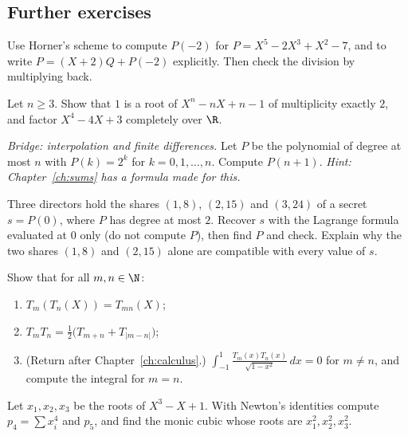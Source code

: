 \subsection*{Further exercises}

\begin{exercise}[$\star$]\label{ex:horner}
Use Horner's scheme to compute $P(-2)$ for $P=X^5-2X^3+X^2-7$, and to write $P=(X+2)Q+P(-2)$ explicitly. Then check the division by multiplying back.
\end{exercise}

\begin{exercise}[$\star$]\label{ex:multroot}
Let $n\ge3$. Show that $1$ is a root of $X^n-nX+n-1$ of multiplicity exactly $2$, and factor $X^4-4X+3$ completely over $\R$.
\end{exercise}

\begin{exercise}[$\star\star$]\label{ex:lagrange2k}
\emph{Bridge: interpolation and finite differences.} Let $P$ be the polynomial of degree at most $n$ with $P(k)=2^k$ for $k=0,1,\dots,n$. Compute $P(n+1)$. \emph{Hint: Chapter~\ref{ch:sums} has a formula made for this.}
\end{exercise}

\begin{exercise}[$\star\star$]\label{ex:secret}
Three directors hold the shares $(1,8)$, $(2,15)$ and $(3,24)$ of a secret $s=P(0)$, where $P$ has degree at most $2$. Recover $s$ with the
Lagrange formula evaluated at $0$ only (do not compute $P$), then find $P$ and check. Explain why the two shares $(1,8)$ and $(2,15)$ alone are
compatible with every value of $s$.
\end{exercise}

\begin{exercise}[$\star\star$]\label{ex:chebprod}
Show that for all $m,n\in\N$:
\begin{enumerate}[label=(\alph*)]
\item $T_m(T_n(X))=T_{mn}(X)$;
\item $T_mT_n=\frac12\bigl(T_{m+n}+T_{|m-n|}\bigr)$;
\item (Return after Chapter~\ref{ch:calculus}.) $\displaystyle\int_{-1}^1\frac{T_m(x)T_n(x)}{\sqrt{1-x^2}}\,dx=0$ for $m\ne n$, and compute the integral for $m=n$.
\end{enumerate}
\end{exercise}

\begin{exercise}[$\star\star$]\label{ex:newtonid}
Let $x_1,x_2,x_3$ be the roots of $X^3-X+1$. With Newton's identities compute $p_4=\sum x_i^4$ and $p_5$, and find the monic cubic whose roots are
$x_1^2,x_2^2,x_3^2$.
\end{exercise}


